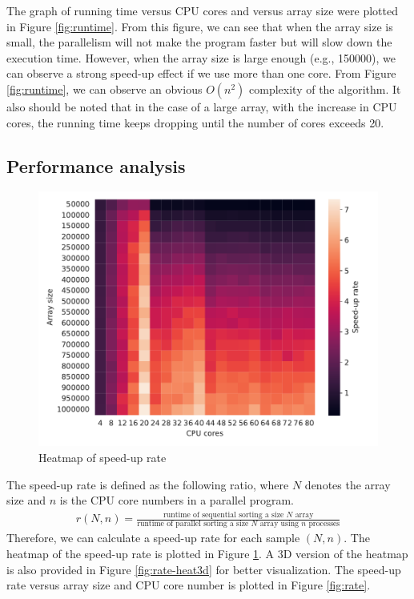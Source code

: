 \documentclass[twoside,12pt]{article}
\theoremstyle{definition}
\theoremstyle{remark}
\begin{document}
The graph of running time versus CPU cores and versus array size were plotted
in Figure \ref{fig:runtime}.
From this figure, we can see that when the array size is small,
the parallelism will not make the program faster but will slow down the execution time.
However, when the array size is large enough (e.g., 150000), we can observe a strong
speed-up effect if we use more than one core.
From Figure \ref{fig:runtime}, we can observe an obvious $O(n^2)$ complexity
of the algorithm.
It also should be noted that in the case of a large array,
with the increase in CPU cores,
the running time keeps dropping until the number of cores exceeds 20.


\subsection{Performance analysis}
\begin{figure}[H]
    \centering
    \includegraphics[width=\textwidth]{../analysis/rate_heatmap.pdf}
    \caption{Heatmap of speed-up rate}
    \label{fig:rate-heat}
\end{figure}
The speed-up rate is defined as the following ratio, where $N$ denotes the array size
and $n$ is the CPU core numbers in a parallel program.
\begin{align}
    r(N, n) = \frac{\text{runtime of sequential sorting a size $N$ array}}
    {\text{runtime of parallel sorting a size $N$ array using $n$ processes}}
\end{align}
Therefore, we can calculate a speed-up rate for each sample $(N, n)$.
The heatmap of the speed-up rate is plotted in Figure \ref{fig:rate-heat}.
A 3D version of the heatmap is also provided in Figure \ref{fig:rate-heat3d} for better visualization.
The speed-up rate versus array size and CPU core number is plotted in Figure \ref{fig:rate}.
\end{document}
